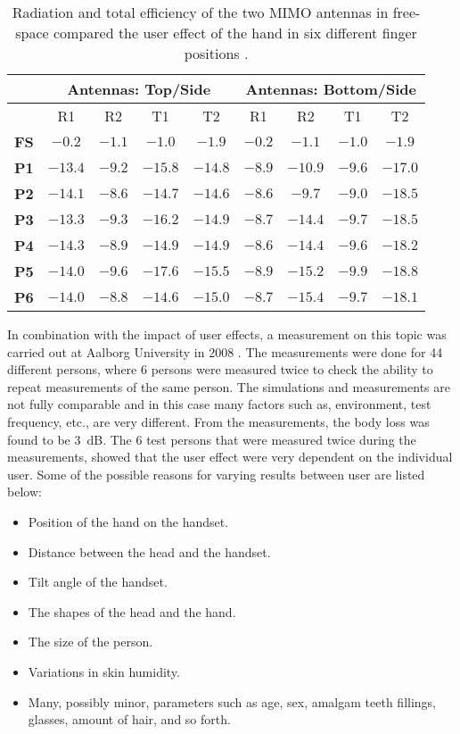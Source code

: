 \begin{table}[htbp]
\centering
\begin{tabular}{|c|c|c|c|c|c|c|c|c|}
\hline
            & \multicolumn{4}{c|}{\textbf{Antennas: Top/Side}} & \multicolumn{4}{c|}{\textbf{Antennas: Bottom/Side}} \\ \hline
             & R1      & R2     & T1      & T2      & R1     & R2      & T1     & T2          \\ \hline
\textbf{FS}  & $-0.2 $ & $-1.1$ & $-1.0 $ & $-1.9 $ & $-0.2$ & $-1.1 $ & $-1.0$ & $-1.9 $       \\ \hline
\textbf{P1}  & $-13.4$ & $-9.2$ & $-15.8$ & $-14.8$ & $-8.9$ & $-10.9$ & $-9.6$ & $-17.0$       \\ \hline
\textbf{P2}  & $-14.1$ & $-8.6$ & $-14.7$ & $-14.6$ & $-8.6$ & $-9.7 $ & $-9.0$ & $-18.5$       \\ \hline
\textbf{P3}  & $-13.3$ & $-9.3$ & $-16.2$ & $-14.9$ & $-8.7$ & $-14.4$ & $-9.7$ & $-18.5$       \\ \hline
\textbf{P4}  & $-14.3$ & $-8.9$ & $-14.9$ & $-14.9$ & $-8.6$ & $-14.4$ & $-9.6$ & $-18.2$       \\ \hline
\textbf{P5}  & $-14.0$ & $-9.6$ & $-17.6$ & $-15.5$ & $-8.9$ & $-15.2$ & $-9.9$ & $-18.8$       \\ \hline
\textbf{P6}  & $-14.0$ & $-8.8$ & $-14.6$ & $-15.0$ & $-8.7$ & $-15.4$ & $-9.7$ & $-18.1$       \\ \hline
\end{tabular}
\caption{Radiation and total efficiency of the two MIMO antennas in free-space compared the user effect of the hand in six different finger positions \cite{Samantha2014UserEff}.}
\label{tab:usereff_radeff}
\end{table}

In combination with the impact of user effects, a measurement on this topic was carried out at Aalborg University in 2008 \cite{sanchez2008multiband}.
The measurements were done for 44 different persons, where 6 persons were measured twice to check the ability to repeat measurements of the same person.  
The simulations and measurements are not fully comparable and in this case many factors such as, environment, test frequency, etc., are very different. From the measurements, the body loss was found to be \SI{3}{dB}. The 6 test persons that were measured twice during the measurements, showed that the user effect were very dependent on the individual user. 
Some of the possible reasons for varying results between user are listed below:
\begin{itemize}
\item Position of the hand on the handset.
\item Distance between the head and the handset.
\item Tilt angle of the handset.
\item The shapes of the head and the hand.
\item The size of the person.
\item Variations in skin humidity.
\item Many, possibly minor, parameters such as age, sex, amalgam teeth fillings, glasses, amount of hair, and so forth.
\end{itemize}

